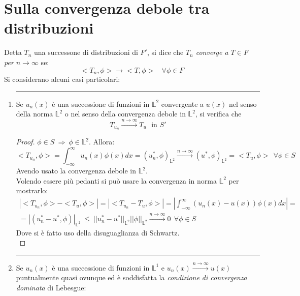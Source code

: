 \documentclass[twoside]{article}
\begin{document}
\section{Sulla convergenza debole tra distribuzioni}
Detta $T_n$ una successone di distribuzioni di $F'$, si dice che \textit{$T_n$ converge a $T\in F$ per $n\to \infty$} se:
\begin{equation}
    <T_n,\phi> \to <T,\phi> \ \ \ \ \forall \phi \in F
\end{equation}
Si considerano alcuni casi particolari:
\begin{enumerate}
    \item 
    \rule{\textwidth}{0.7pt}
    Se $u_n(x)$ è una successione di funzioni in $\mathds{L}^2$ convergente a $u(x)$ nel senso della norma $\mathds{L}^2$ o nel senso della convergenza debole in $\mathds{L}^2$, si verifica che
    \begin{equation}
        T_{u_n} \xrightarrow{n \to \infty} T_u \ \ \ \text{in $S'$}
    \end{equation}
    \begin{proof}
    $\phi \in S \ \Rightarrow \ \phi \in \mathds{L}^2$. Allora:
    \begin{equation}
        <T_{u_{n}},\phi>=\int_{-\infty}^{\infty}u_n(x)\phi(x) dx=(u_n ^*,\phi)_{\mathds{L}^2}\xrightarrow{n\to \infty}(u ^*,\phi)_{\mathds{L}^2}=<T_u,\phi> \ \ \forall \phi \in S
    \end{equation}
    Avendo usato la convergenza debole in $\mathds{L}^2$.\\
    Volendo essere più pedanti si può usare la convergenza in norma $\mathds{L}^2$ per mostrarlo:
    \begin{equation}\begin{split}
        |<T_{u_{n}},\phi>-<T_u,\phi>|=|<T_{u_{n}}-T_u,\phi>|=\left|\int_{-\infty}^{\infty} (u_n(x)-u(x))\phi(x) dx \right|= \\
        =|(u_n ^* - u^*,\phi)|_{\mathds{L}^2}\ \le \ || u_n ^* - u^*||_{\mathds{L}^2} ||\phi||_{\mathds{L}^2} \xrightarrow{n\to \infty} 0 \ \ \forall \phi \in S
   \end{split} \end{equation}
   Dove si è fatto uso della disuguaglianza di Schwartz.\\
    \end{proof}
    \item
     \rule{\textwidth}{0.7pt}
     Se $u_n(x)$ è una successione di funzioni in $\mathds{L}^1$ e $u_n(x)\xrightarrow{n\to \infty}u(x)$ puntualmente quasi ovunque ed è soddisfatta la \textit{condizione di convergenza dominata} di Lebesgue:

\end{enumerate}
\end{document}

